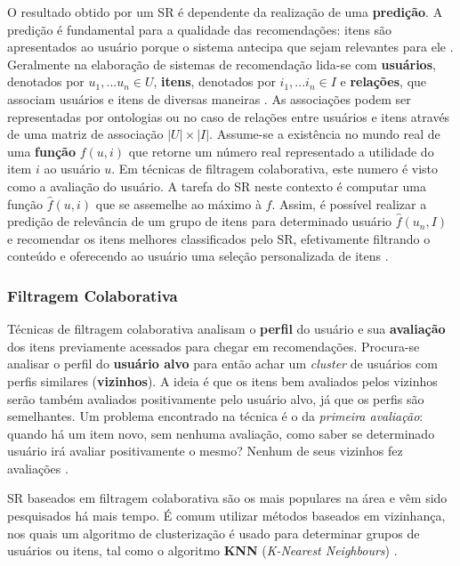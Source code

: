 \documentclass[12pt]{article}
\begin{document}
O resultado obtido por um SR é dependente da realização de uma \textbf{predição}. A predição é fundamental para a qualidade 
das recomendações: itens são apresentados ao usuário porque o sistema antecipa que sejam relevantes para ele 
\cite{ricci2011introduction}. Geralmente na elaboração de sistemas de recomendação lida-se com \textbf{usuários}, denotados por 
$ u_1, ... u_n \in U $, \textbf{itens}, denotados por $ i_1, ... i_n \in I$  e \textbf{relações}, que associam usuários e 
itens de diversas maneiras \cite{ekstrand2019recommender}. As associações podem ser representadas por ontologias 
\cite{primo2006tecnicas} ou no caso de relações entre usuários e itens através de uma matriz de associação $ |U| \times |I| $. 
Assume-se a existência no mundo real de uma \textbf{função} $ f (u, i) $ que retorne um número real representado a utilidade do 
item $i$ ao usuário $u$. Em técnicas de filtragem colaborativa, este numero é visto como a avaliação do usuário. A tarefa do SR 
neste contexto é computar uma função $\hat{f}(u, i)$ que se assemelhe ao máximo à $f$. 
Assim, é possível realizar a predição de relevância de um grupo de itens para determinado usuário $\hat{f}(u_n, I)$ e recomendar 
os itens melhores classificados pelo SR, efetivamente filtrando o conteúdo e oferecendo ao usuário uma seleção personalizada de 
itens \cite{ricci2011introduction}.

\subsubsection{Filtragem Colaborativa}

Técnicas de filtragem colaborativa analisam o \textbf{perfil} do usuário e sua \textbf{avaliação} dos itens previamente 
acessados para chegar em recomendações. Procura-se analisar o perfil do \textbf{usuário alvo} para então achar um \textit{cluster} 
de usuários com perfis similares (\textbf{vizinhos}). A ideia é que os itens bem avaliados pelos vizinhos serão também 
avaliados positivamente pelo usuário alvo, já que os perfis são semelhantes. Um problema encontrado na técnica é o da \textit{primeira avaliação}: quando há um item novo, sem nenhuma avaliação, como saber se determinado usuário irá avaliar 
positivamente o mesmo? Nenhum de seus vizinhos fez avaliações \cite{ricci2011introduction}.

SR baseados em filtragem colaborativa são os mais populares na área e vêm sido pesquisados há mais tempo. \cite{ricci2011introduction} 
É comum utilizar métodos baseados em vizinhança, nos quais um algoritmo de clusterização é usado para determinar grupos 
de usuários ou itens, tal como o algoritmo \textbf{KNN} (\textit{K-Nearest Neighbours}) \cite{da2018desenvolvimento}.
\end{document}
